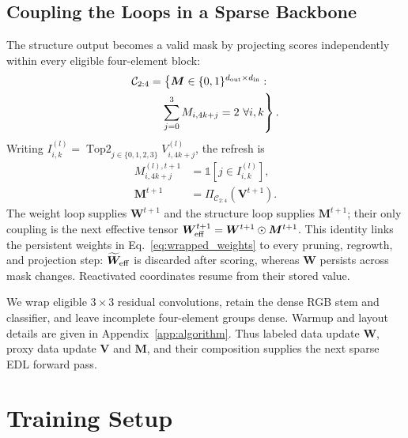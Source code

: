 \documentclass[letterpaper]{article}
\DeclareMathOperator{\TopTwo}{Top2}
\begin{document}
\subsection{Coupling the Loops in a Sparse Backbone}\label{sec:loop_coupling}
The structure output becomes a valid mask by projecting scores independently within every eligible four-element block:
\begin{equation}\label{eq:c24}
\begin{aligned}
\mathcal C_{2:4}
&=\left\{\bm M\in\{0,1\}^{d_{\rm out}\times d_{\rm in}}:\right.\\
&\left.\quad\sum_{j=0}^{3}M_{i,4k+j}=2\ \forall i,k\right\}.
\end{aligned}
\end{equation}
Writing $I_{i,k}^{(l)}=\TopTwo_{j\in\{0,1,2,3\}}V_{i,4k+j}^{(l)}$, the refresh is
\begin{equation}\label{eq:mask}
\begin{aligned}
M_{i,4k+j}^{(l),t+1}
&=\mathbb 1[j\in I_{i,k}^{(l)}],\\
\bm M^{t+1}
&=\Pi_{\mathcal C_{2:4}}(\bm V^{t+1}).
\end{aligned}
\end{equation}
The weight loop supplies $\bm W^{t+1}$ and the structure loop supplies $\bm M^{t+1}$; their only coupling is the next effective tensor $\bm W_{\rm eff}^{t+1}=\bm W^{t+1}\odot\bm M^{t+1}$. This identity links the persistent weights in Eq.~\ref{eq:wrapped_weights} to every pruning, regrowth, and projection step: $\widetilde{\bm W}_{\rm eff}$ is discarded after scoring, whereas $\bm W$ persists across mask changes. Reactivated coordinates resume from their stored value.

We wrap eligible $3\times3$ residual convolutions, retain the dense RGB stem and classifier, and leave incomplete four-element groups dense. Warmup and layout details are given in Appendix~\ref{app:algorithm}. Thus labeled data update $\bm W$, proxy data update $\bm V$ and $\bm M$, and their composition supplies the next sparse EDL forward pass.

\section{Training Setup}\label{sec:training_setup}
\end{document}
